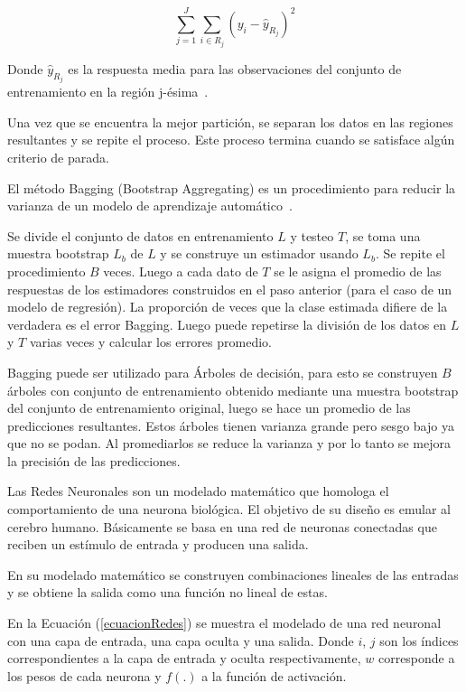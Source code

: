 \documentclass[a4paper,12pt,twocolumn]{article}
\begin{document}
$$
\sum_{j=1}^{J} \sum_{i \in R_{j}}\left(y_{i}-\hat{y}_{R_{j}}\right)^{2}
$$

Donde $\hat{y}_{R_{j}}$ es la respuesta media para las observaciones del conjunto de entrenamiento en la región j-ésima~\cite{libroCurso}.

Una vez que se encuentra la mejor partición, se separan los datos en las regiones resultantes y se repite el proceso. Este proceso termina cuando se satisface algún criterio de parada.

El método Bagging (Bootstrap Aggregating) es un procedimiento para reducir la varianza de un modelo de aprendizaje automático~\cite{libroCurso}.

Se divide el conjunto de datos en entrenamiento $L$ y testeo $T$, se toma una muestra bootstrap $L_b$ de $L$ y se construye un estimador usando $L_b$. Se repite el procedimiento $B$ veces. Luego a cada dato de $T$ se le asigna el promedio de las respuestas de los estimadores construidos en el paso anterior (para el caso de un modelo de regresión). La proporción de veces que la clase estimada difiere de la verdadera es el error Bagging. Luego puede repetirse la división de los datos en $L$ y $T$ varias veces y calcular los errores promedio.

Bagging puede ser utilizado para Árboles de decisión, para esto se construyen $B$ árboles con conjunto de entrenamiento obtenido mediante una muestra bootstrap del conjunto de entrenamiento original, luego se hace un promedio de las predicciones resultantes. Estos árboles tienen varianza grande pero sesgo bajo ya que no se podan. Al promediarlos se reduce la varianza y por lo tanto se mejora la precisión de las predicciones.

Las Redes Neuronales son un modelado matemático que homologa el comportamiento de una neurona biológica. El objetivo de su diseño es emular al cerebro humano. Básicamente se basa en una red de neuronas conectadas que reciben un estímulo de entrada y producen una salida.   

En su modelado matemático se construyen combinaciones lineales de las entradas y se obtiene la salida como una función no lineal de estas. 

En la Ecuación (\ref{ecuacionRedes}) se muestra el modelado de una red neuronal con una capa de entrada, una capa oculta y una salida. Donde $i$, $j$ son los índices correspondientes a la capa de entrada y oculta respectivamente, $w$ corresponde a los pesos de cada neurona y $f(.)$ a la función de activación.
\end{document}
